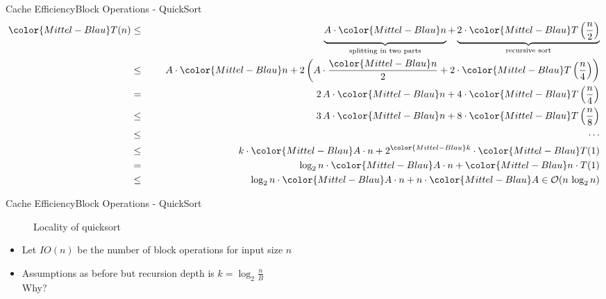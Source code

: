 \begin{frame}{Cache Efficiency}{Block Operations - QuickSort}
  {\color{Mittel-Blau}
  \begin{eqnarray*}
    {\color{Mittel-Blau}T(n)} &\leq\hspace{1.5em}&
      \underbrace{
        A \cdot {\color{Mittel-Blau}n}
        \vphantom{\frac{n}{2}}
      }_{\text{splitting in two parts}}
      +
      \underbrace{
        2 \cdot {\color{Mittel-Blau}T\left(\frac{n}{2}\right)}
      }_{\text{recursive sort}}\\
    {} &\leq&
      A \cdot {\color{Mittel-Blau}n} + 2 \left(
        A \cdot \frac{\color{Mittel-Blau}n}{2}
        + 2 \cdot {\color{Mittel-Blau}T\left(\frac{n}{4}\right)}
      \right)\\
    {} &=&
      2\,A \cdot {\color{Mittel-Blau}n}
      + 4 \cdot {\color{Mittel-Blau}T\left(\frac{n}{4}\right)}\\
    {} &\leq&
      3\,A \cdot {\color{Mittel-Blau}n}
      + 8 \cdot {\color{Mittel-Blau}T\left(\frac{n}{8}\right)}\\
    {} &\leq&\hspace{1.5em}\cdots\\
    {} &\leq&
      k \cdot {\color{Mittel-Blau}A \cdot n}
      + 2^{\color{Mittel-Blau}k}
      \cdot {\color{Mittel-Blau}T(1)}\\
    {} &=&
      \log_2 n \cdot {\color{Mittel-Blau}A \cdot n}
      + {\color{Mittel-Blau}n \cdot T(1)}\\
    {} &\leq&
      \log_2 n \cdot {\color{Mittel-Blau}A \cdot n}
      + n \cdot {\color{Mittel-Blau}A}
      \in \mathcal{O}(n \, \log_2 n)
  \end{eqnarray*}}
\end{frame}


\begin{frame}{Cache Efficiency}{Block Operations - QuickSort}
  \begin{figure}%
    \begin{adjustbox}{width=\linewidth}%
    \end{adjustbox}%
    \caption{Locality of quicksort}
    \label{fig:caching:memory_locality_quicksort}
  \end{figure}%
  \begin{itemize}
    \item<2->
      Let {\color{Mittel-Blau}$IO(n)$} be the number of
      {\color{Mittel-Blau}block operations} for input size {\color{Mittel-Blau}$n$}
    \item<3->
      Assumptions as before but recursion depth is {\color{Mittel-Blau}$k = \log_2 \frac{n}{B}$}\\
      {\color{cyan}Why?}
  \end{itemize}
\end{frame}


